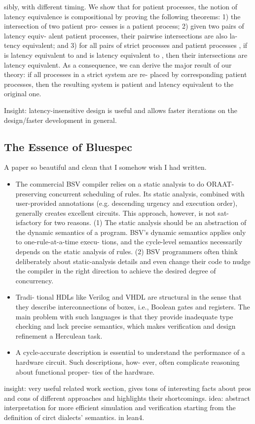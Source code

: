 \documentclass[]{article}
\begin{document}
\begin{itemize}
    sibly, with different timing. We show that for patient processes,
    the notion of latency equivalence is compositional by proving
    the following theorems: 1) the intersection of two patient pro-
    cesses is a patient process; 2) given two pairs of latency equiv-
    alent patient processes, their pairwise intersections are also la-
    tency equivalent; and 3) for all pairs of strict processes
    and patient processes , if is latency equivalent to
    and is latency equivalent to , then their intersections are
    latency equivalent. As a consequence, we can derive the major
    result of our theory: if all processes in a strict system are re-
    placed by corresponding patient processes, then the resulting
    system is patient and latency equivalent to the original one. 
\end{itemize}

Insight: latency-insensitive design is useful and allows faster iterations on 
the design/faster development in general.

\subsection{The Essence of Bluespec}

A paper so beautiful and clean that I somehow wish I had written.

\begin{itemize}
    \item The commercial BSV compiler relies on a static analysis
    to do ORAAT-preserving concurrent scheduling of rules. Its
    static analysis, combined with user-provided annotations
    (e.g. descending urgency and execution order), generally
    creates excellent circuits. This approach, however, is not sat-
    isfactory for two reasons. (1) The static analysis should be
    an abstraction of the dynamic semantics of a program. BSV’s
    dynamic semantics applies only to one-rule-at-a-time execu-
    tions, and the cycle-level semantics necessarily depends on
    the static analysis of rules. (2) BSV programmers often think
    deliberately about static-analysis details and even change
    their code to nudge the compiler in the right direction to
    achieve the desired degree of concurrency.
    \item Tradi-
    tional HDLs like Verilog and VHDL are structural in the sense
    that they describe interconnections of boxes, i.e., Boolean
    gates and registers. The main problem with such languages is
    that they provide inadequate type checking and lack precise
    semantics, which makes verification and design refinement
    a Herculean task.
    \item A cycle-accurate description is essential to understand the
    performance of a hardware circuit. Such descriptions, how-
    ever, often complicate reasoning about functional proper-
    ties of the hardware. 
\end{itemize}
insight: very useful related work section, gives tons of 
interesting facts about pros and cons of different approaches 
and highlights their shortcomings. 
idea: abstract interpretation for more efficient simulation
and verification starting from the definition of circt dialects'
semantics. in lean4. 
\end{document}

